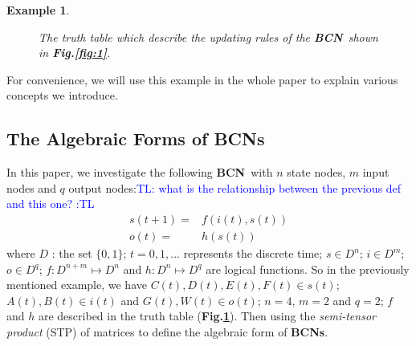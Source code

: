 \documentclass[letterpaper, 10 pt, conference]{ieeeconf}  %
\newtheorem{example}{Example}
\def \BCN {{\bf BCN}}
\newcommand{\tl}[1]{\textcolor{blue} {TL: #1 :TL} }
\begin{document}
\begin{example}
  \begin{figure}[thpb]
      \centering
      
      \caption{The truth table which describe the updating rules of the \BCN\ shown in {\bf Fig.\ref{fig:1}}.}
      \label{fig:2}
   \end{figure}
\end{example}   
For convenience, we will use this example in the whole paper to explain various concepts we introduce.


\subsection{The Algebraic Forms of BCNs}
In this paper, we investigate the following \BCN\ with $n$ state nodes, $m$ input nodes and $q$ output nodes:\tl{what is the relationship between the previous def and this one?}
\begin{equation}
\begin{split}
s(t+1)=&f(i(t),s(t))\\
o(t)=&h(s(t))
\end{split}
\end{equation}
where $D$ : the set $\{0,1\}$; $t=0,1,...$ represents the discrete time; $s\in D^n$; $i\in D^m$; $o\in D^q$; $f:D^{n+m}\mapsto D^n$ and $h:D^n\mapsto D^q$ are logical functions. So in the previously mentioned example, we have $C(t), D(t), E(t), F(t)\in s(t)$; $A(t), B(t)\in i(t)$ and $G(t), W(t)\in o(t)$; $n=4$, $m=2$ and $q=2$; $f$ and $h$ are described in the truth table ({\bf Fig.\ref{fig:2}}). Then using the \emph{semi-tensor product}  (STP) of matrices to define the algebraic form of {\bf BCNs}. 
\end{document}
